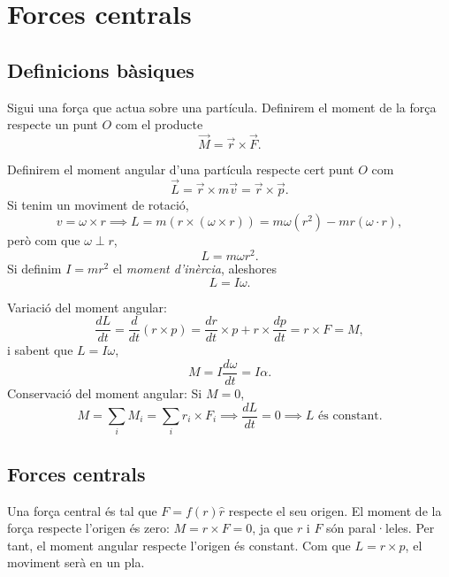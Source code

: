 \chapter{Forces centrals}
\section{Definicions bàsiques}
\begin{defi}
Sigui una força que actua sobre una partícula. Definirem el moment de la força respecte un punt $O$ com el producte \[\vec M=\vec r\times\vec F.\]
\end{defi}
\begin{defi}
Definirem el moment angular d'una partícula respecte cert punt $O$ com \[\vec L=\vec r\times m\vec v=\vec r\times\vec p.\]Si tenim un moviment de rotació, \[v = \omega\times r\implies L=m(r\times(\omega\times r))=m\omega(r^2)-mr(\omega\cdot r),\]
però com que $\omega\perp r$,
\[
L=m\omega r^2.
\]
Si definim $I=mr^2$ el \textit{moment d'inèrcia}, aleshores
\[
L=I\omega.
\]
\end{defi}
\begin{obs}
Variació del moment angular:
\[
\dfrac{dL}{dt}=\dfrac{d}{dt}(r\times p)=\dfrac{dr}{dt}\times p+r\times\dfrac{dp}{dt}=r\times F=M,
\]
i sabent que $L=I\omega$,
\[
M=I\dfrac{d\omega}{dt}=I\alpha.
\]
Conservació del moment angular:
Si $M=0$,
\[
M=\sum_iM_i=\sum_ir_i\times F_i\implies\dfrac{dL}{dt}=0\implies L\text{ és constant.}
\]
\end{obs}
\section{Forces centrals}
Una força central és tal que $F=f(r)\hat r$ respecte el seu origen. El moment de la força respecte l'origen és zero: $M=r\times F=0$, ja que $r$ i $F$ són paral·leles. Per tant, el moment angular respecte l'origen és constant. Com que $L=r\times p$, el moviment serà en un pla.

